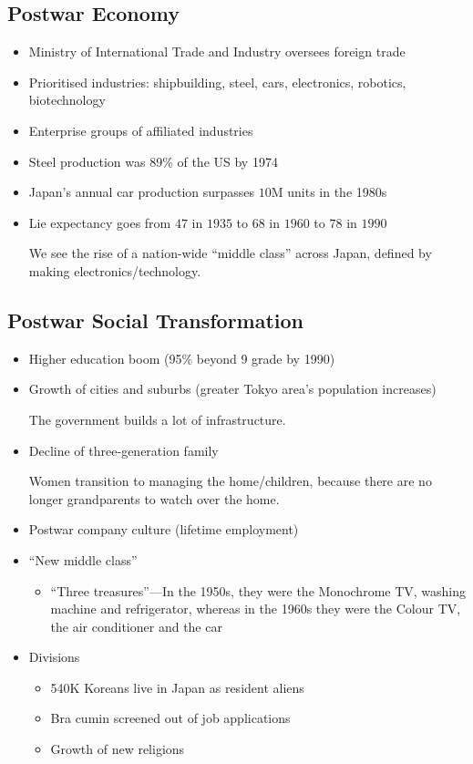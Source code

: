 \documentclass[class=article, crop=false]{standalone}
\begin{document}
  \subsection{Postwar Economy}
  \begin{itemize}
    \item Ministry of International Trade and Industry oversees foreign trade
    \item Prioritised industries: shipbuilding, steel, cars, electronics, robotics, biotechnology
    \item Enterprise groups of affiliated industries
    \item Steel production was 89\% of the US by 1974
    \item Japan's annual car production surpasses $10$M units in the 1980s
    \item Lie expectancy goes from $47$ in $1935$ to $68$ in $1960$ to $78$ in $1990$
    \begin{note}{}
      We see the rise of a nation-wide ``middle class'' across Japan, defined by making electronics/technology.
    \end{note}
  \end{itemize}
  \subsection{Postwar Social Transformation}
  \begin{itemize}
    \item Higher education boom (95\% beyond 9 grade by 1990)
    \item Growth of cities and suburbs (greater Tokyo area's population increases)
    \begin{note}{}
      The government builds a lot of infrastructure.
    \end{note}
    \item Decline of three-generation family
    \begin{note}{}
      Women transition to managing the home/children, because there are no longer grandparents to watch over the home.
    \end{note}
    \item Postwar company culture (lifetime employment)
    \item ``New middle class''
    \begin{itemize}
      \item ``Three treasures''---In the 1950s, they were the Monochrome TV, washing machine and refrigerator, whereas in the 1960s they were the Colour TV, the air conditioner and the car
    \end{itemize}
    \item Divisions
    \begin{itemize}
      \item 540K Koreans live in Japan as resident aliens
      \item Bra cumin screened out of job applications
      \item Growth of new religions
    \end{itemize}
  \end{itemize}
\end{document}
